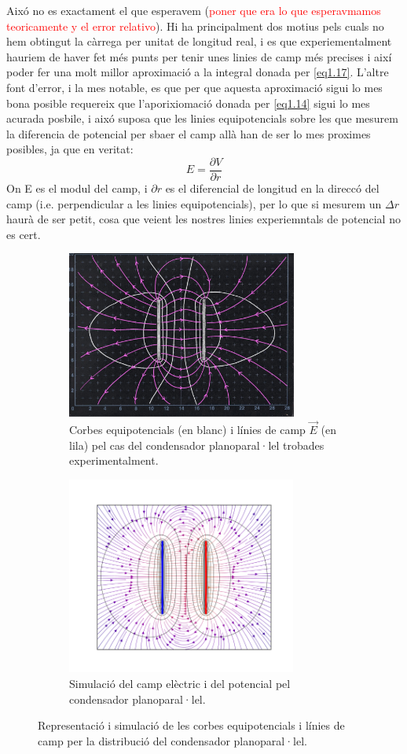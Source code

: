 \documentclass[a4paper,10.5pt]{report}
\begin{document}
Aixó no es exactament el que esperavem (\textcolor{red}{poner que era lo que esperavmamos teoricamente y el error relativo}). Hi ha principalment dos motius pels cuals no hem obtingut la càrrega per unitat de longitud real, i es que experiementalment hauriem de haver fet més punts per tenir unes linies de camp més precises i així poder fer una molt millor aproximació a la integral donada per \eqref{eq1.17}. L'altre font d'error, i la mes notable, es que per que aquesta aproximació sigui lo mes bona posible requereix que l'aporixiomació donada per \eqref{eq1.14} sigui lo mes acurada posbile, i aixó suposa que les linies equipotencials sobre les que mesurem la diferencia de potencial per sbaer el camp allà han de ser lo mes proximes posibles, ja que en veritat:
\begin{equation}
	E = \frac{\partial V}{\partial r}
\end{equation}
On E es el modul del camp, i $\partial r$ es el diferencial de longitud en la direccó del camp (i.e. perpendicular a les linies equipotencials), per lo que si mesurem un  $\Delta r$ haurà de ser petit, cosa que veient les nostres linies experiemntals de potencial no es cert.
\begin{figure}[h]
	\centering
	\begin{subfigure}{0.45\linewidth}
		\centering
		\includegraphics[height=5.5cm]{dibplaques} %
		\caption{Corbes equipotencials (en blanc) i línies de camp $\vec{E}$ (en lila) pel cas del condensador planoparal·lel trobades experimentalment.}
		\label{fig:1.2a}
	\end{subfigure}
	\hfill
	\begin{subfigure}{0.53\linewidth}
		\centering
		\includegraphics[height=6.5cm]{figplaques1} %
		\caption{Simulació del camp elèctric i del potencial pel condensador planoparal·lel.}
		\label{fig:1.2b}
	\end{subfigure}
	\caption{Representació i simulació de les corbes equipotencials i línies de camp per la distribució del condensador planoparal·lel.}
	\label{fig:1.2}
\end{figure}
\end{document}
